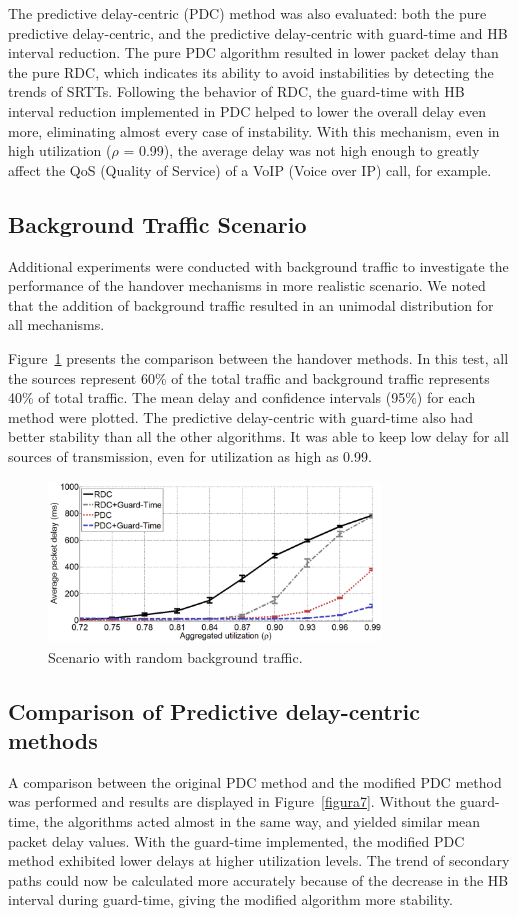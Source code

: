 \documentclass{sbrt2015}
\begin{document}
The predictive delay-centric (PDC) method was also evaluated: both the pure predictive delay-centric, and the predictive delay-centric with guard-time and HB interval reduction. The pure PDC algorithm resulted in lower packet delay than the pure RDC, which indicates its ability to avoid instabilities by detecting the trends of SRTTs.
Following the behavior of RDC, the guard-time with HB interval reduction implemented in PDC helped to lower the overall delay even more, eliminating almost every case of instability. With this mechanism, even in high utilization ($\rho$ = 0.99), the average delay was not high enough to greatly affect the QoS (Quality of Service) of a VoIP (Voice over IP) call, for example.

\subsection{Background Traffic Scenario}
Additional experiments were conducted with background traffic to investigate the performance of the handover mechanisms in more realistic scenario. 
We noted that the addition of background traffic resulted in an unimodal distribution for all mechanisms.

Figure~\ref{figura6} presents the comparison between the handover methods. In this test, all the sources represent 60\% of the total traffic and background traffic represents 40\% of total traffic. The mean delay and confidence intervals (95\%) for each method were plotted. The predictive delay-centric with guard-time also had better stability than all the other algorithms. It was able to keep low delay for all sources of transmission, even for utilization as high as 0.99.


\begin{figure}[h!]
\centering
\includegraphics[width=8.8cm,height=4.3cm]{figura6}
\caption{Scenario with random background traffic.}
\label{figura6}
\end{figure}

\subsection{Comparison of Predictive delay-centric methods}
A comparison between the original PDC method and the modified PDC method was performed and results are displayed in Figure~\ref{figura7}.
Without the guard-time, the algorithms acted almost in the same way, and yielded similar mean packet delay values. 
With the guard-time implemented, the modified PDC method exhibited lower delays at higher utilization levels. 
The trend of secondary paths could now be calculated more accurately because of the decrease in the HB interval during guard-time, giving the modified algorithm
more stability. 
\end{document}
